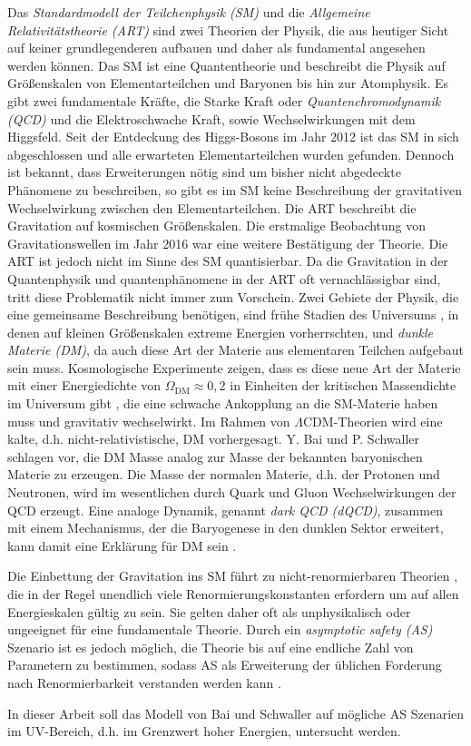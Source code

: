 Das \textit{Standardmodell der Teilchenphysik (SM)} und die 
\textit{Allgemeine Relativitätstheorie (ART)} sind zwei Theorien der 
Physik, die aus heutiger Sicht auf keiner grundlegenderen aufbauen und 
daher als fundamental angesehen werden können. Das SM ist eine Quantentheorie 
und beschreibt die Physik auf Größenskalen von Elementarteilchen und 
Baryonen bis hin zur Atomphysik. Es gibt zwei fundamentale Kräfte, 
die Starke Kraft oder \textit{Quantenchromodynamik (QCD)} und die 
Elektroschwache Kraft, sowie Wechselwirkungen mit dem Higgsfeld. Seit 
der Entdeckung des Higgs-Bosons im Jahr 2012 \cite{Higgs} ist das SM in sich 
abgeschlossen und alle erwarteten Elementarteilchen wurden gefunden.  
Dennoch ist bekannt, dass Erweiterungen nötig sind um bisher nicht abgedeckte 
Phänomene zu beschreiben, so gibt es im SM keine Beschreibung der gravitativen 
Wechselwirkung zwischen den Elementarteilchen. Die ART beschreibt die 
Gravitation auf kosmischen Größenskalen. Die erstmalige Beobachtung von 
Gravitationswellen im Jahr 2016 \cite{gravitational_waves} war eine weitere 
Bestätigung der Theorie. Die ART ist jedoch nicht im Sinne des SM 
quantisierbar. Da die Gravitation in der Quantenphysik und quantenphänomene 
in der ART oft vernachlässigbar sind, tritt diese Problematik nicht immer zum 
Vorschein. Zwei Gebiete der Physik, die eine gemeinsame 
Beschreibung benötigen, sind frühe Stadien des Universums 
\cite{GR_Introductory}, in denen auf kleinen 
Größenskalen extreme Energien vorherrschten, und \textit{dunkle Materie (DM)}, 
da auch diese Art der Materie aus elementaren Teilchen aufgebaut sein muss.
Kosmologische Experimente zeigen, dass es diese neue Art der Materie mit einer 
Energiedichte von $\Omega_\text{DM}\approx 0,2$ in Einheiten der kritischen 
Massendichte im Universum gibt \cite{PDG:DM}, die eine schwache 
Ankopplung an die SM-Materie haben muss und gravitativ wechselwirkt. 
Im Rahmen von $\Lambda$CDM-Theorien wird eine kalte, d.h. 
nicht-relativistische, DM vorhergesagt. 
Y. Bai und P. Schwaller schlagen vor, 
die DM Masse analog zur Masse der bekannten baryonischen Materie zu erzeugen.  
Die Masse der normalen Materie, d.h. der Protonen und Neutronen, wird im 
wesentlichen durch Quark und Gluon Wechselwirkungen der 
QCD erzeugt. Eine analoge Dynamik, genannt 
\textit{dark QCD (dQCD)}, zusammen mit einem Mechanismus, der die 
Baryogenese in den dunklen Sektor erweitert, kann damit eine  
Erklärung für DM sein \cite{Scale_of_dark_QCD}. 

Die Einbettung der Gravitation ins SM führt zu nicht-renormierbaren Theorien 
\cite{GR_Weinberg}, die in der Regel unendlich 
viele Renormierungskonstanten erfordern um auf allen Energieskalen gültig 
zu sein. Sie gelten daher oft als unphysikalisch oder ungeeignet für   
eine fundamentale Theorie. Durch ein \textit{asymptotic safety (AS)} 
Szenario ist es jedoch möglich, die Theorie bis auf eine endliche Zahl von 
Parametern zu bestimmen, sodass AS als Erweiterung der üblichen Forderung 
nach Renormierbarkeit verstanden werden kann \cite{GR_Weinberg}
\cite{Weinberg:1976}.

In dieser Arbeit soll das \QCDxdQCD Modell von Bai und Schwaller auf 
mögliche AS Szenarien im UV-Bereich, d.h. im Grenzwert hoher Energien, 
untersucht werden. 
    
